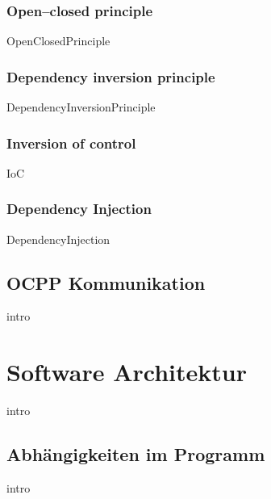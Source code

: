 \documentclass{article}
\begin{document}
        \subsubsection{Open–closed principle}
        \label{kap:OCP}
            {OpenClosedPrinciple}
            
                   
        \subsubsection{Dependency inversion principle}
        \label{kap:DIP}
            {DependencyInversionPrinciple}

        \subsubsection{Inversion of control}
        \label{kap:IoC}
            {IoC}

        \subsubsection{Dependency Injection}
        \label{DependencyInjection}
            {DependencyInjection}

    \newpage
    \subsection{OCPP Kommunikation}
        {intro}

\newpage

\section{Software Architektur}
    
    \label{kap:commonArchitectureDescription}
        {intro}

        \subsection{Abhängigkeiten im Programm}
        \label{kap:Structur}
            {intro}
            \label{kap:StrukturIntro}
\end{document}
